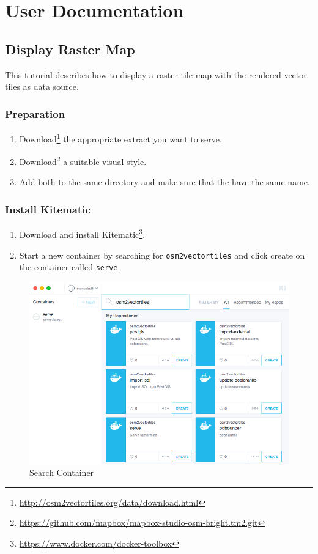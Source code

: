 \chapter{User Documentation}

\section*{Display Raster Map}

This tutorial describes how to display a raster tile map with the rendered vector tiles as data source.

\subsection*{Preparation}

\begin{enumerate}
\item
  Download\footnote{\url{http://osm2vectortiles.org/data/download.html}} the appropriate extract you want to serve.
\item
  Download\footnote{\url{https://github.com/mapbox/mapbox-studio-osm-bright.tm2.git}} a suitable visual style.
\item
  Add both to the same directory and make sure that the have the same name.
\end{enumerate}

\subsection*{Install Kitematic}

\begin{enumerate}
\item
  Download and install
  Kitematic\footnote{\url{https://www.docker.com/docker-toolbox}}.
\item
  Start a new container by searching for \texttt{osm2vectortiles} and
  click create on the container called \texttt{serve}.
\end{enumerate}

\begin{figure}[H]
\centering
\includegraphics[width=1\textwidth]{images/search_container.png}
\caption{Search Container}
\end{figure}

